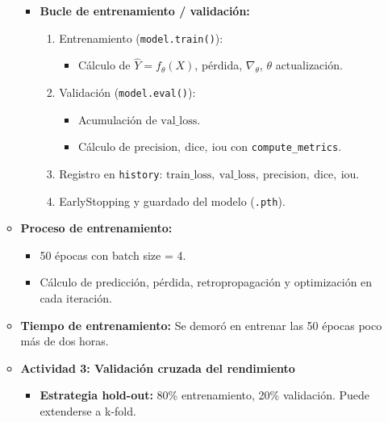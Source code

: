 \begin{enumerate}
\begin{itemize}
\begin{itemize}
    \item \textbf{Bucle de entrenamiento / validación:}
      \begin{enumerate}
        \item Entrenamiento (\texttt{model.train()}):
          \begin{itemize}
            \item Cálculo de \(\hat{Y}=f_\theta(X)\), pérdida, \(\nabla_\theta\), \(\theta\) actualización.
          \end{itemize}
        \item Validación (\texttt{model.eval()}):
          \begin{itemize}
            \item Acumulación de \(\mathrm{val\_loss}\).
            \item Cálculo de \(\text{precision},\ \text{dice},\ \text{iou}\) con \texttt{compute\_metrics}.
          \end{itemize}
        \item Registro en \texttt{history}: \(\mathrm{train\_loss},\ \mathrm{val\_loss},\ \mathrm{precision},\ \mathrm{dice},\ \mathrm{iou}\).
        \item EarlyStopping y guardado del modelo (\texttt{.pth}).
      \end{enumerate}
  
      \end{itemize}
  
      \item \textbf{Proceso de entrenamiento:}
      \begin{itemize}
        \item 50 épocas con batch size = 4.
        \item Cálculo de predicción, pérdida, retropropagación y optimización en cada iteración.
      \end{itemize}
    
      \item \textbf{Tiempo de entrenamiento:}
      Se demoró en entrenar las 50 épocas poco más de dos horas.
    

  \vspace{0.5cm}

  \item\textbf{Actividad 3: Validación cruzada del rendimiento}
  \begin{itemize}
    \item \textbf{Estrategia hold-out:}
      80\% entrenamiento, 20\% validación. Puede extenderse a k-fold.
  

\end{itemize}
\end{itemize}
\end{enumerate}
